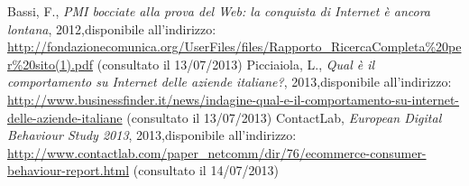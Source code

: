 \begin{thebibliography}{9}
   Bassi, F., \textit{PMI bocciate alla prova del Web: la conquista di Internet è ancora lontana}, 2012,\newline disponibile all'indirizzo: \url{http://fondazionecomunica.org/UserFiles/files/Rapporto_RicercaCompleta%20per%20sito(1).pdf} (consultato il 13/07/2013)
   Picciaiola, L., \textit{Qual è il comportamento su Internet delle aziende italiane?}, 2013,\newline disponibile all'indirizzo: \url{http://www.businessfinder.it/news/indagine-qual-e-il-comportamento-su-internet-delle-aziende-italiane} (consultato il 13/07/2013)
   ContactLab, \textit{European Digital Behaviour Study 2013}, 2013,\newline disponibile all'indirizzo: \url{http://www.contactlab.com/paper_netcomm/dir/76/ecommerce-consumer-behaviour-report.html} (consultato il 14/07/2013)
\end{thebibliography}


